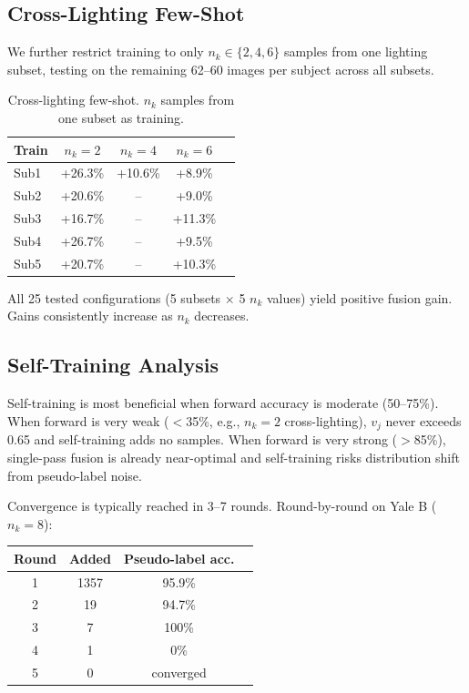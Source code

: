 \documentclass[10pt,comsoc]{IEEEtran}
\begin{document}
\subsection{Cross-Lighting Few-Shot}

We further restrict training to only $n_k \in \{2,4,6\}$ samples from one lighting subset, testing on the remaining 62--60 images per subject across all subsets.

\begin{table}[t]
\centering
\caption{Cross-lighting few-shot. $n_k$ samples from one subset as training.}
\label{tab:fewshot}
\begin{tabular}{lcccc}
\hline
\textbf{Train} & $n_k=2$ & $n_k=4$ & $n_k=6$ \\ \hline
Sub1 & +26.3\% & +10.6\% & +8.9\% \\
Sub2 & +20.6\% & -- & +9.0\% \\
Sub3 & +16.7\% & -- & +11.3\% \\
Sub4 & +26.7\% & -- & +9.5\% \\
Sub5 & +20.7\% & -- & +10.3\% \\ \hline
\end{tabular}
\end{table}

All 25 tested configurations (5 subsets $\times$ 5 $n_k$ values) yield positive fusion gain. Gains consistently increase as $n_k$ decreases.

\subsection{Self-Training Analysis}

Self-training is most beneficial when forward accuracy is moderate (50--75\%). When forward is very weak ($<$35\%, e.g., $n_k=2$ cross-lighting), $v_j$ never exceeds 0.65 and self-training adds no samples. When forward is very strong ($>$85\%), single-pass fusion is already near-optimal and self-training risks distribution shift from pseudo-label noise.

Convergence is typically reached in 3--7 rounds. Round-by-round on Yale B ($n_k=8$):

\begin{center}
\begin{tabular}{cccc}
\hline
\textbf{Round} & \textbf{Added} & \textbf{Pseudo-label acc.} \\ \hline
1 & 1357 & 95.9\% \\
2 & 19 & 94.7\% \\
3 & 7 & 100\% \\
4 & 1 & 0\% \\
5 & 0 & converged \\ \hline
\end{tabular}
\end{center}
\end{document}
